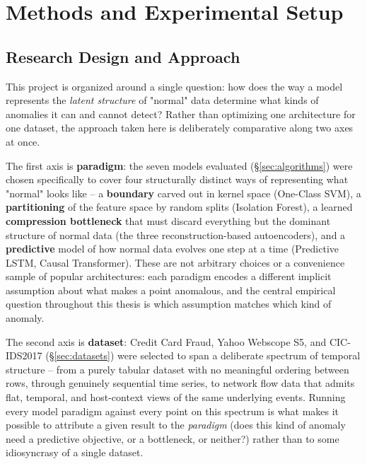\chapter{Methods and Experimental Setup}
\label{ch:methodology}


\section{Research Design and Approach}
\label{sec:approach}

This project is organized around a single question: how does the way a model represents the \emph{latent structure} of "normal" data determine what kinds of anomalies it can and cannot detect? Rather than optimizing one architecture for one dataset, the approach taken here is deliberately comparative along two axes at once.

The first axis is \textbf{paradigm}: the seven models evaluated (\S\ref{sec:algorithms}) were chosen specifically to cover four structurally distinct ways of representing what "normal" looks like -- a \textbf{boundary} carved out in kernel space (One-Class SVM), a \textbf{partitioning} of the feature space by random splits (Isolation Forest), a learned \textbf{compression bottleneck} that must discard everything but the dominant structure of normal data (the three reconstruction-based autoencoders), and a \textbf{predictive} model of how normal data evolves one step at a time (Predictive LSTM, Causal Transformer). These are not arbitrary choices or a convenience sample of popular architectures: each paradigm encodes a different implicit assumption about what makes a point anomalous, and the central empirical question throughout this thesis is which assumption matches which kind of anomaly.

The second axis is \textbf{dataset}: Credit Card Fraud, Yahoo Webscope S5, and CIC-IDS2017 (\S\ref{sec:datasets}) were selected to span a deliberate spectrum of temporal structure -- from a purely tabular dataset with no meaningful ordering between rows, through genuinely sequential time series, to network flow data that admits flat, temporal, and host-context views of the same underlying events. Running every model paradigm against every point on this spectrum is what makes it possible to attribute a given result to the \emph{paradigm} (does this kind of anomaly need a predictive objective, or a bottleneck, or neither?) rather than to some idiosyncrasy of a single dataset.

